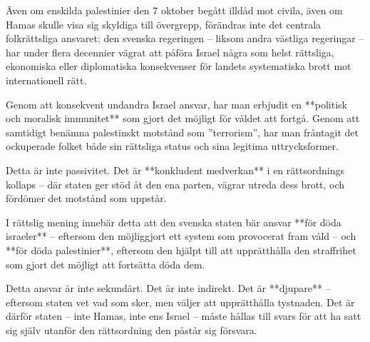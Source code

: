 Även om enskilda palestinier den 7 oktober begått illdåd mot civila, även om Hamas skulle visa sig skyldiga till övergrepp, förändras inte det centrala folkrättsliga ansvaret: den svenska regeringen – liksom andra västliga regeringar – har under flera decennier vägrat att påföra Israel några som helst rättsliga, ekonomiska eller diplomatiska konsekvenser för landets systematiska brott mot internationell rätt.

Genom att konsekvent undandra Israel ansvar, har man erbjudit en **politisk och moralisk immunitet** som gjort det möjligt för våldet att fortgå. Genom att samtidigt benämna palestinskt motstånd som ”terrorism”, har man fråntagit det ockuperade folket både sin rättsliga status och sina legitima uttrycksformer.

Detta är inte passivitet. Det är **konkludent medverkan** i en rättsordnings kollaps – där staten ger stöd åt den ena parten, vägrar utreda dess brott, och fördömer det motstånd som uppstår.

I rättslig mening innebär detta att den svenska staten bär ansvar **för döda israeler** – eftersom den möjliggjort ett system som provocerat fram våld – och **för döda palestinier**, eftersom den hjälpt till att upprätthålla den straffrihet som gjort det möjligt att fortsätta döda dem.

Detta ansvar är inte sekundärt. Det är inte indirekt. Det är **djupare** – eftersom staten vet vad som sker, men väljer att upprätthålla tystnaden. Det är därför staten – inte Hamas, inte ens Israel – måste hållas till svars för att ha satt sig själv utanför den rättsordning den påstår sig försvara.


